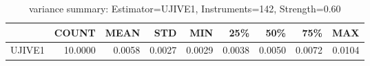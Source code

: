 \begin{table}[ht]
\centering
\caption{variance summary: Estimator=UJIVE1, Instruments=142, Strength=0.60}
\begin{tabular}{lrrrrrrrr}
\toprule
 & COUNT & MEAN & STD & MIN & 25\% & 50\% & 75\% & MAX \\
\midrule
UJIVE1 & 10.0000 & 0.0058 & 0.0027 & 0.0029 & 0.0038 & 0.0050 & 0.0072 & 0.0104 \\
\bottomrule
\end{tabular}
\end{table}
